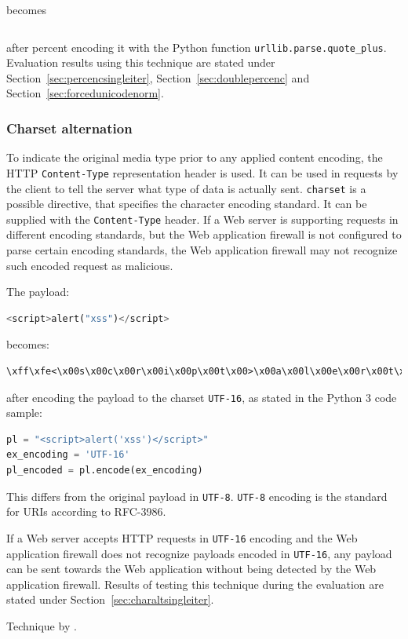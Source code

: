 becomes 

\begin{lstlisting}[style=basicStyle, language=Python]
%3Cscript%3Ealert%28%27XSS%27%29%3C%2Fscript%3E
\end{lstlisting}

after percent encoding it with the Python function \verb|urllib.parse.quote_plus|. Evaluation results using this technique are stated under Section~\ref{sec:percencsingleiter}, Section~\ref{sec:doublepercenc} and Section~\ref{sec:forcedunicodenorm}.


\subsubsection{Charset alternation}
To indicate the original media type prior to any applied content encoding, the HTTP \verb|Content-Type| representation header is used.
It can be used in requests by the client to tell the server what type of data is actually sent.
\verb|charset| is a possible directive, that specifies the character encoding standard.
It can be supplied with the \verb|Content-Type| header. \cite{http/contenttype}
If a Web server is supporting requests in different encoding standards, but the Web application firewall is not configured to parse certain encoding standards, the Web application firewall may not recognize such encoded request as malicious.

The payload: 

\begin{lstlisting}[style=basicStyle, language=Python]
<script>alert("xss")</script>
\end{lstlisting}

becomes:

\begin{lstlisting}[style=basicStyle]
\xff\xfe<\x00s\x00c\x00r\x00i\x00p\x00t\x00>\x00a\x00l\x00e\x00r\x00t\x00(\x00'\x00x\x00s\x00s\x00'\x00)\x00<\x00/\x00s\x00c\x00r\x00i\x00p\x00t\x00>\x00
\end{lstlisting}

after encoding the payload to the charset \verb|UTF-16|, as stated in the Python 3 code sample:

\begin{lstlisting}[style=basicStyle, language=Python]
pl = "<script>alert('xss')</script>"
ex_encoding = 'UTF-16'
pl_encoded = pl.encode(ex_encoding)
\end{lstlisting}

This differs from the original payload in \verb|UTF-8|. \verb|UTF-8| encoding is the standard for URIs according to RFC-3986. \cite{rfc3986} 

If a Web server accepts HTTP requests in \verb|UTF-16| encoding and the Web application firewall does not recognize payloads encoded in \verb|UTF-16|, any payload can be sent towards the Web application without being detected by the Web application firewall. Results of testing this technique during the evaluation are stated under Section~\ref{sec:charaltsingleiter}.

Technique by \cite{medium/allypetitt}.
